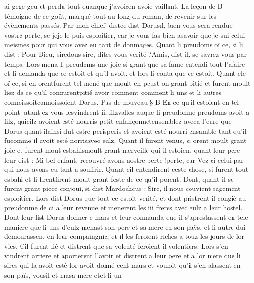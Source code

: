 \documentclass{article}
\begin{document}
\begin{pages}
         ai gege geu et 
      perdu tout quanque 
      j’avoieen avoie vaillant.
   La leçon de B témoigne de ce goût, marqué tout au long du roman, de revenir sur les évènements passés.
   Par mon chief, distce dist 
      Dorusil, bien vous sera rendue vostre perte, 
      se jeje le puis esploitier, car je vous fas bien asavoir que 
      je sui celui meismes pour qui vous avez eu tant de donmages.
   Quant li preudoms oï ce, si li dist :
   Pour Dieu, siredous sire, 
      dites vous verité ?Amis, dist il, se savrez vous par temps.
   Lors mena li preudoms une joie si grant que sa fame 
   entendi tout l’afaire et li demanda que ce estoit et qu’il avoit, 
      et lors li conta que ce estoit. Quant ele oï ce, 
      si en orentfurent tel mené que moult en peust on grant 
   pitié et furent moult liez de ce qu’il connurentpitié avoir comment comment 
      li uns et li autres connoissoitconnoissoient 
   Dorus. \pend
\pstart Pas de nouveau § B En ce qu’il estoient en tel point, 
   atant ez vous lesvindrent 
   iii filzvalles 
   auque li 
   preudonme preudoms avoit a filz, 
   quicilz avoient esté nourris 
   petit enfançonnetensemblez 
   aveca l'eure que 
   Dorus quant ilainsi dut estre 
   perisperis et avoient esté nourri ensamble tant 
      qu'il fucomme il avoit esté norrisavec eulz. 
   Quant il furent venus, si orent moult grant joie et 
   furent mout esbahismoult grant merveille qui il estoient quant 
   leur pere leur dist :
   Mi bel enfant, recouvré avons nostre 
      perte !perte, car 
      Vez ci celui par qui nous avons eu tant a souffrir.
   Quant cil entendirent ceste chose, si furent tout esbahi et li 
   firentfirent moult grant feste 
   de ce qu’il porent. 
   Dont, quant il se furent grant piece conjoui, si dist Mardocheus :
   Sire, il nous couvient sagement esploitier.
   Lors dist Dorus que tout ce estoit verité, 
   et dont pristrent il 
   congié au preudonme de ci a leur revenue et menerent les iii freres avec eulz a leur hostel. 
   Dont leur fist Dorus donner c mars et leur conmanda que 
   il s’aprestassent en tele maniere que li uns d’eulz menast 
      son pere et sa mere en son paÿs, 
   et li autre dui demourassent en leur compaingnie, et il les feroient riches a touz les jours de lor vies. 
   Cil furent lié et distrent que sa volenté feroient il volentiers. \pend
\pstart Lors s’en vindrent arriere et aporterent l’avoir et distrent a 
   leur pere et a lor mere que 
   li sires qui la avoit esté lor avoit donné cent mars 
      et vouloit qu’il s’en alassent en son païs, 
   vousil et 
      masa mere 
   etet li un 

\end{pages}
\end{document}
